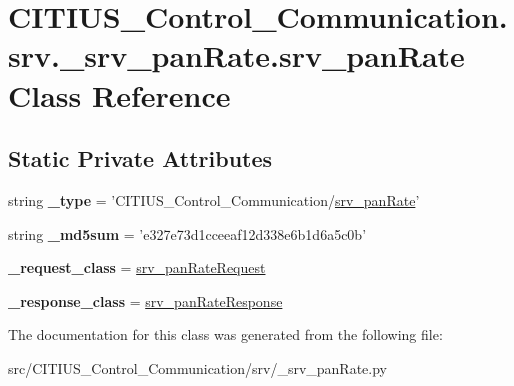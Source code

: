 \hypertarget{class_c_i_t_i_u_s___control___communication_1_1srv_1_1__srv__pan_rate_1_1srv__pan_rate}{\section{\-C\-I\-T\-I\-U\-S\-\_\-\-Control\-\_\-\-Communication.\-srv.\-\_\-srv\-\_\-pan\-Rate.\-srv\-\_\-pan\-Rate \-Class \-Reference}
\label{class_c_i_t_i_u_s___control___communication_1_1srv_1_1__srv__pan_rate_1_1srv__pan_rate}
}
\subsection*{\-Static \-Private \-Attributes}
\begin{DoxyCompactItemize}
\item 
\hypertarget{class_c_i_t_i_u_s___control___communication_1_1srv_1_1__srv__pan_rate_1_1srv__pan_rate_a03cc63f4e6b34e0b2eff925ff3684733}{string {\bfseries \-\_\-type} = '\-C\-I\-T\-I\-U\-S\-\_\-\-Control\-\_\-\-Communication/\hyperlink{class_c_i_t_i_u_s___control___communication_1_1srv_1_1__srv__pan_rate_1_1srv__pan_rate}{srv\-\_\-pan\-Rate}'}\label{class_c_i_t_i_u_s___control___communication_1_1srv_1_1__srv__pan_rate_1_1srv__pan_rate_a03cc63f4e6b34e0b2eff925ff3684733}

\item 
\hypertarget{class_c_i_t_i_u_s___control___communication_1_1srv_1_1__srv__pan_rate_1_1srv__pan_rate_a503905617db3782824c28b94aca4f532}{string {\bfseries \-\_\-md5sum} = 'e327e73d1cceeaf12d338e6b1d6a5c0b'}\label{class_c_i_t_i_u_s___control___communication_1_1srv_1_1__srv__pan_rate_1_1srv__pan_rate_a503905617db3782824c28b94aca4f532}

\item 
\hypertarget{class_c_i_t_i_u_s___control___communication_1_1srv_1_1__srv__pan_rate_1_1srv__pan_rate_a1601cd0fecf4b4fcb47d01cfa5c10f73}{{\bfseries \-\_\-request\-\_\-class} = \hyperlink{class_c_i_t_i_u_s___control___communication_1_1srv_1_1__srv__pan_rate_1_1srv__pan_rate_request}{srv\-\_\-pan\-Rate\-Request}}\label{class_c_i_t_i_u_s___control___communication_1_1srv_1_1__srv__pan_rate_1_1srv__pan_rate_a1601cd0fecf4b4fcb47d01cfa5c10f73}

\item 
\hypertarget{class_c_i_t_i_u_s___control___communication_1_1srv_1_1__srv__pan_rate_1_1srv__pan_rate_a3d0c839ff4d9520ad8d3d8107c6bd6fa}{{\bfseries \-\_\-response\-\_\-class} = \hyperlink{class_c_i_t_i_u_s___control___communication_1_1srv_1_1__srv__pan_rate_1_1srv__pan_rate_response}{srv\-\_\-pan\-Rate\-Response}}\label{class_c_i_t_i_u_s___control___communication_1_1srv_1_1__srv__pan_rate_1_1srv__pan_rate_a3d0c839ff4d9520ad8d3d8107c6bd6fa}

\end{DoxyCompactItemize}


\-The documentation for this class was generated from the following file\-:\begin{DoxyCompactItemize}
\item 
src/\-C\-I\-T\-I\-U\-S\-\_\-\-Control\-\_\-\-Communication/srv/\-\_\-srv\-\_\-pan\-Rate.\-py\end{DoxyCompactItemize}
